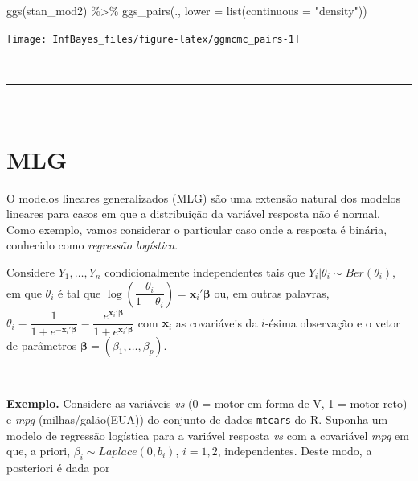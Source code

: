 \documentclass[
]{book}
\newenvironment{Shaded}{\begin{snugshade}}{\end{snugshade}}
\newcommand{\AttributeTok}[1]{\textcolor[rgb]{0.77,0.63,0.00}{#1}}
\newcommand{\FunctionTok}[1]{\textcolor[rgb]{0.00,0.00,0.00}{#1}}
\newcommand{\NormalTok}[1]{#1}
\newcommand{\SpecialCharTok}[1]{\textcolor[rgb]{0.00,0.00,0.00}{#1}}
\newcommand{\StringTok}[1]{\textcolor[rgb]{0.31,0.60,0.02}{#1}}
\begin{document}
\begin{Shaded}
\begin{Highlighting}[]
\FunctionTok{ggs}\NormalTok{(stan\_mod2) }\SpecialCharTok{\%\textgreater{}\%} \FunctionTok{ggs\_pairs}\NormalTok{(., }\AttributeTok{lower =} \FunctionTok{list}\NormalTok{(}\AttributeTok{continuous =} \StringTok{"density"}\NormalTok{))}
\end{Highlighting}
\end{Shaded}

\begin{center}\texttt{[image: InfBayes\_files/figure-latex/ggmcmc\_pairs-1]} \end{center}

\(~\)

\begin{center}\rule{0.5\linewidth}{0.5pt}\end{center}

\(~\)

\hypertarget{mlg}{%
\section{MLG}\label{mlg}}

O modelos lineares generalizados (MLG) são uma extensão natural dos modelos lineares para casos em que a distribuição da variável resposta não é normal. Como exemplo, vamos considerar o particular caso onde a resposta é binária, conhecido como \emph{regressão logística}.

Considere \(Y_1,\ldots,Y_n\) condicionalmente independentes tais que \(Y_i|\theta_i \sim \textit{Ber}(\theta_i)\), em que \(\theta_i\) é tal que \(\log\left(\dfrac{\theta_i}{1-\theta_i}\right) = \boldsymbol x_i' \boldsymbol\beta\) ou, em outras palavras, \(\theta_i = \dfrac{1}{1+e^{-\boldsymbol x_i' \boldsymbol\beta}} = \dfrac{e^{\boldsymbol x_i' \boldsymbol\beta}}{1+e^{\boldsymbol x_i' \boldsymbol\beta}}\) com \(\boldsymbol x_i\) as covariáveis da \(i\)-ésima observação e o vetor de parâmetros \(\boldsymbol\beta=(\beta_1,\ldots,\beta_p)\).

\(~\)

\textbf{Exemplo.} Considere as variáveis \emph{vs} (0 = motor em forma de V, 1 = motor reto) e \emph{mpg} (milhas/galão(EUA)) do conjunto de dados \texttt{mtcars} do R. Suponha um modelo de regressão logística para a variável resposta \emph{vs} com a covariável \emph{mpg} em que, a priori, \(\beta_i \sim \textit{Laplace}(0,b_i)\), \(i=1,2\), independentes. Deste modo, a posteriori é dada por
\end{document}
